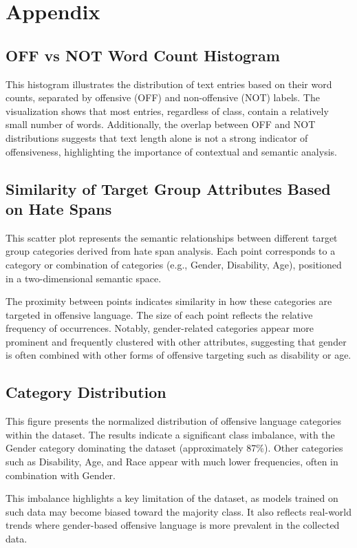 \documentclass[12pt]{article}
\begin{document}
\section{Appendix}

\subsection{OFF vs NOT Word Count Histogram}

This histogram illustrates the distribution of text entries based on their word counts, separated by offensive (OFF) and non-offensive (NOT) labels. The visualization shows that most entries, regardless of class, contain a relatively small number of words. Additionally, the overlap between OFF and NOT distributions suggests that text length alone is not a strong indicator of offensiveness, highlighting the importance of contextual and semantic analysis.

\subsection{Similarity of Target Group Attributes Based on Hate Spans}

This scatter plot represents the semantic relationships between different target group categories derived from hate span analysis. Each point corresponds to a category or combination of categories (e.g., Gender, Disability, Age), positioned in a two-dimensional semantic space.

The proximity between points indicates similarity in how these categories are targeted in offensive language. The size of each point reflects the relative frequency of occurrences. Notably, gender-related categories appear more prominent and frequently clustered with other attributes, suggesting that gender is often combined with other forms of offensive targeting such as disability or age.

\subsection{Category Distribution}

This figure presents the normalized distribution of offensive language categories within the dataset. The results indicate a significant class imbalance, with the Gender category dominating the dataset (approximately 87\%). Other categories such as Disability, Age, and Race appear with much lower frequencies, often in combination with Gender.

This imbalance highlights a key limitation of the dataset, as models trained on such data may become biased toward the majority class. It also reflects real-world trends where gender-based offensive language is more prevalent in the collected data.
\end{document}
